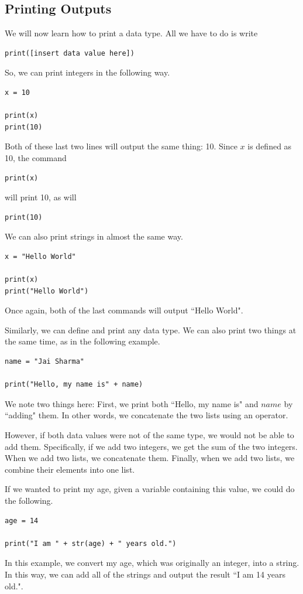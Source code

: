 \documentclass{article}
\begin{document}
\subsection{Printing Outputs}
We will now learn how to print a data type. All we have to do is write
\begin{lstlisting}
print([insert data value here])
\end{lstlisting}

So, we can print integers in the following way.
\begin{lstlisting}
x = 10

print(x)
print(10)
\end{lstlisting}
Both of these last two lines will output the same thing: 10. Since $x$ is defined as 10, the command
\begin{lstlisting}
print(x)
\end{lstlisting}
will print 10, as will
\begin{lstlisting}
print(10)
\end{lstlisting}

We can also print strings in almost the same way.
\begin{lstlisting}
x = "Hello World"

print(x)
print("Hello World")
\end{lstlisting}
Once again, both of the last commands will output ``Hello World". 

Similarly, we can define and print any data type. We can also print two things at the same time, as in the following example.
\begin{lstlisting}
name = "Jai Sharma"

print("Hello, my name is" + name)
\end{lstlisting}
We note two things here: First, we print both ``Hello, my name is" and $name$ by ``adding" them. In other words, we concatenate the two lists using an operator.

However, if both data values were not of the same type, we would not be able to add them. Specifically, if we add two integers, we get the sum of the two integers. When we add two lists, we concatenate them. Finally, when we add two lists, we combine their elements into one list. 

If we wanted to print my age, given a variable containing this value, we could do the following.
\begin{lstlisting}
age = 14

print("I am " + str(age) + " years old.")
\end{lstlisting}
In this example, we convert my age, which was originally an integer, into a string. In this way, we can add all of the strings and output the result ``I am 14 years old.". 
\end{document}
